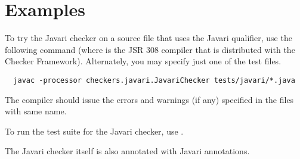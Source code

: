 \section{Examples\label{javari-examples}}

To try the Javari checker on a source file that uses the Javari
qualifier, use the following command (where  is the JSR 308
compiler  that
is distributed with the Checker Framework).  Alternately, you may
specify just one of the test files.

\begin{Verbatim}
  javac -processor checkers.javari.JavariChecker tests/javari/*.java
\end{Verbatim}

\noindent
The compiler should issue the errors and warnings (if any) specified in the
 files with same name.

To run the test suite for the Javari checker, use .

The Javari checker itself is also annotated with Javari annotations.


